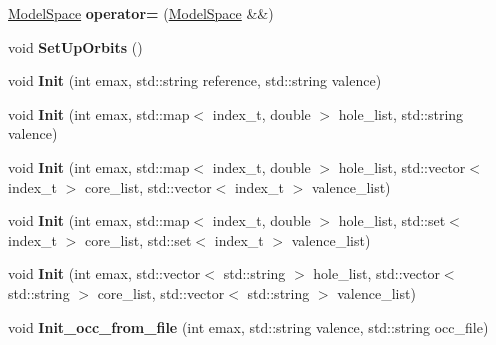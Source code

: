 \begin{DoxyCompactItemize}
\item 
\hypertarget{classModelSpace_ab1d44cc22730d233506daa4f6e83187c}{\hyperlink{classModelSpace}{Model\-Space} {\bfseries operator=} (\hyperlink{classModelSpace}{Model\-Space} \&\&)}\label{classModelSpace_ab1d44cc22730d233506daa4f6e83187c}

\item 
\hypertarget{classModelSpace_a26965e0baf1585e756d790fffa93c0e0}{void {\bfseries Set\-Up\-Orbits} ()}\label{classModelSpace_a26965e0baf1585e756d790fffa93c0e0}

\item 
\hypertarget{classModelSpace_aabf0b2634707a056eaf3f387ae837b86}{void {\bfseries Init} (int emax, std\-::string reference, std\-::string valence)}\label{classModelSpace_aabf0b2634707a056eaf3f387ae837b86}

\item 
\hypertarget{classModelSpace_a0aa7a0c97d8c971210e2012d53490b32}{void {\bfseries Init} (int emax, std\-::map$<$ index\-\_\-t, double $>$ hole\-\_\-list, std\-::string valence)}\label{classModelSpace_a0aa7a0c97d8c971210e2012d53490b32}

\item 
\hypertarget{classModelSpace_a134f18c926b82b66a59811f6a47e1db8}{void {\bfseries Init} (int emax, std\-::map$<$ index\-\_\-t, double $>$ hole\-\_\-list, std\-::vector$<$ index\-\_\-t $>$ core\-\_\-list, std\-::vector$<$ index\-\_\-t $>$ valence\-\_\-list)}\label{classModelSpace_a134f18c926b82b66a59811f6a47e1db8}

\item 
\hypertarget{classModelSpace_a3f1c6c25d162ec70787a0e3426aa3c91}{void {\bfseries Init} (int emax, std\-::map$<$ index\-\_\-t, double $>$ hole\-\_\-list, std\-::set$<$ index\-\_\-t $>$ core\-\_\-list, std\-::set$<$ index\-\_\-t $>$ valence\-\_\-list)}\label{classModelSpace_a3f1c6c25d162ec70787a0e3426aa3c91}

\item 
\hypertarget{classModelSpace_a53306cc577aed149cd5cdeefcb32a668}{void {\bfseries Init} (int emax, std\-::vector$<$ std\-::string $>$ hole\-\_\-list, std\-::vector$<$ std\-::string $>$ core\-\_\-list, std\-::vector$<$ std\-::string $>$ valence\-\_\-list)}\label{classModelSpace_a53306cc577aed149cd5cdeefcb32a668}

\item 
\hypertarget{classModelSpace_af1cc46cf7eff85b3932a1ab93350e2c8}{void {\bfseries Init\-\_\-occ\-\_\-from\-\_\-file} (int emax, std\-::string valence, std\-::string occ\-\_\-file)}\label{classModelSpace_af1cc46cf7eff85b3932a1ab93350e2c8}


\end{DoxyCompactItemize}
